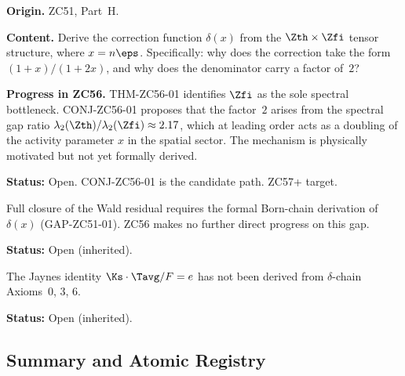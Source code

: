 \documentclass[12pt, a4paper]{article}
\begin{document}
\begin{openqbox}[title={GAP-ZC51-01: Born-Chain Boundary Layer
  (Inherited, Partial Progress)}]
\textbf{Origin.} ZC51, Part~H.

\textbf{Content.}
Derive the correction function $\delta(x)$ from the
$\Zth\times\Zfi$ tensor structure, where $x=n\eps$.
Specifically: why does the correction take the form
$(1+x)/(1+2x)$, and why does the denominator carry
a factor of~$2$?

\textbf{Progress in ZC56.}
THM-ZC56-01 identifies $\Zfi$ as the sole spectral bottleneck.
CONJ-ZC56-01 proposes that the factor~$2$ arises from the
spectral gap ratio $\lambda_2(\Zth)/\lambda_2(\Zfi)\approx2.17$,
which at leading order acts as a doubling of the activity
parameter $x$ in the spatial sector.  The mechanism is
physically motivated but not yet formally derived.

\textbf{Status:} Open.  CONJ-ZC56-01 is the candidate path.
ZC57+ target.
\end{openqbox}

\begin{openqbox}[title={GAP-ZC53-01 / GAP-ZC42-02:
  Wald Residual $0.16\%$ (Inherited)}]
Full closure of the Wald residual requires the formal
Born-chain derivation of $\delta(x)$ (GAP-ZC51-01).
ZC56 makes no further direct progress on this gap.

\textbf{Status:} Open (inherited).
\end{openqbox}

\begin{openqbox}[title={GAP-ZC54-01: Jaynes K20 from Axioms
  (Inherited)}]
The Jaynes identity $\Ks\cdot\Tavg/F=e$ has not been derived
from $\delta$-chain Axioms~0, 3, 6.

\textbf{Status:} Open (inherited).
\end{openqbox}

\subsection{Summary and Atomic Registry}
\end{document}

